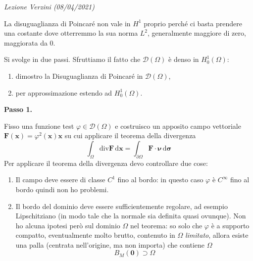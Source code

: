 \documentclass[10pt,a4paper,twoside,openright]{book}
\newcounter{conteggioV}
\newcommand{\LezioneV}[1]{
	\stepcounter{conteggioV}
	\textit{Lezione Verzini \arabic{conteggioV} (#1)}
	}
\newcommand{\x}{\mathbf{x}}
\newcommand{\zer}{\mathbf{0}}
\newcommand{\sigg}{\bm{\sigma}}
\newcommand{\de}{\,\mathrm d}
\newcommand{\dxx}{\de \x}
\newcommand{\dsig}{\de \sigg}
\begin{document}
\LezioneV{08/04/2021}
\begin{oss}
    La disuguaglianza di Poincaré non vale in $H^{1} $ proprio perché ci basta prendere una costante dove otterremmo la sua norma $L^2$, generalmente maggiore di zero, maggiorata da $0$.
\end{oss}
\begin{dimostrazione}
    Si svolge in due passi. Sfruttiamo il fatto che $\mathcal{D}(\Omega)$ è denso in $H_{0}^{1}(\Omega)$:
    \begin{enumerate}
        \item dimostro la Disuguaglianza di Poincaré in $\mathcal{D}(\Omega)$,
        \item per approssimazione estendo ad $H_{0}^{1}(\Omega)$.
    \end{enumerate}

    \textbf{Passo 1.}

    Fisso una funzione test $\varphi \in \mathcal{D}(\Omega)$ e costruisco un apposito campo vettoriale $\boxed{\mathbf{F}(\x) =\varphi ^{2}(\x)\x}$ su cui applicare il teorema della divergenza
    \begin{equation*}
        \int _{\Omega }\mathrm{div}\mathbf{F} \dxx =\int _{\partial \Omega }\mathbf{F} \cdotp \bm{\nu } \dsig
    \end{equation*}
    Per applicare il teorema della divergenza devo controllare due cose:
    \begin{enumerate}
        \item Il campo deve essere di classe $C^{1}$ fino al bordo: in questo caso $\varphi $ è $C^{\infty }$ fino al bordo quindi non ho problemi.
        \item Il bordo del dominio deve essere sufficientemente regolare, ad esempio Lipschitziano (in modo tale che la normale sia definita quasi ovunque). Non ho alcuna ipotesi però sul dominio $\Omega $ nel teorema: so solo che $\varphi $ è a supporto compatto, eventualmente molto brutto, contenuto in $\Omega $ \textit{limitato}, allora esiste una palla (centrata nell'origine, ma non importa) che contiene $\Omega $
              \begin{equation*}
                  B_{M}(\zer) \supset \Omega
              \end{equation*}

              \begin{figure}[H]
                  \centering


\end{figure}
\end{enumerate}
\end{dimostrazione}
\end{document}
